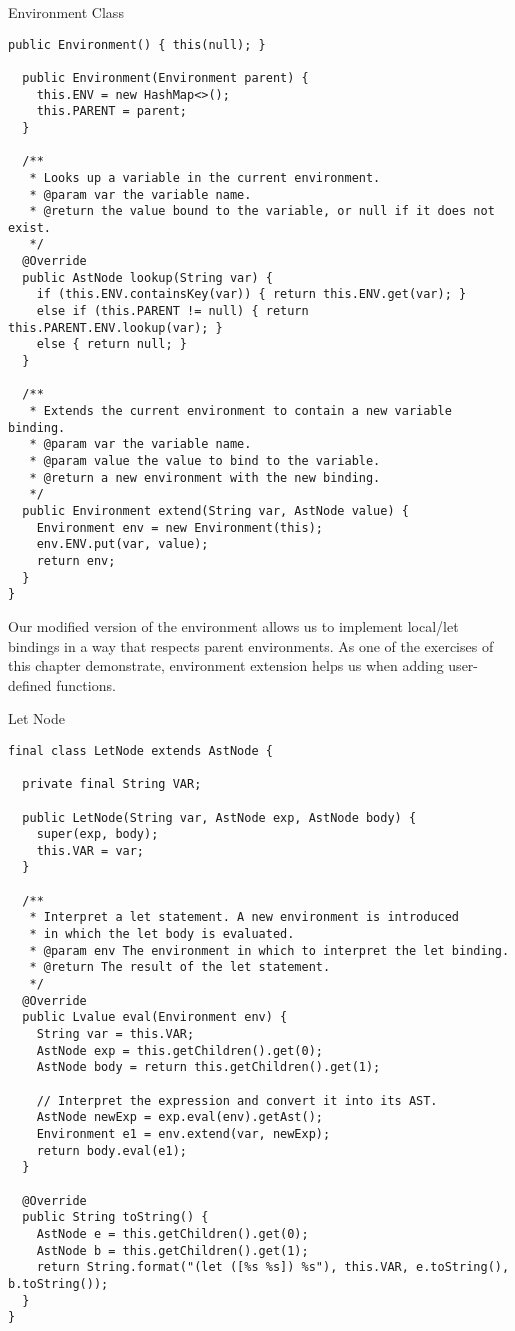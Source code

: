 \begin{verbnobox}[\footnotesize]
\begin{cl}[]{Environment Class}
\begin{lstlisting}[language=MyJava]
  public Environment() { this(null); }

  public Environment(Environment parent) { 
    this.ENV = new HashMap<>(); 
    this.PARENT = parent; 
  }

  /**
   * Looks up a variable in the current environment.
   * @param var the variable name.
   * @return the value bound to the variable, or null if it does not exist.
   */
  @Override
  public AstNode lookup(String var) {
    if (this.ENV.containsKey(var)) { return this.ENV.get(var); }
    else if (this.PARENT != null) { return this.PARENT.ENV.lookup(var); }
    else { return null; }
  }

  /**
   * Extends the current environment to contain a new variable binding.
   * @param var the variable name.
   * @param value the value to bind to the variable.
   * @return a new environment with the new binding.
   */
  public Environment extend(String var, AstNode value) {
    Environment env = new Environment(this);
    env.ENV.put(var, value);
    return env;
  }
}
\end{lstlisting}
\end{cl} 

Our modified version of the environment allows us to implement local/let bindings in a way that respects parent environments. As one of the exercises of this chapter demonstrate, environment extension helps us when adding user-defined functions.

\begin{cl}[]{Let Node}
\begin{lstlisting}[language=MyJava]
final class LetNode extends AstNode {

  private final String VAR;

  public LetNode(String var, AstNode exp, AstNode body) {
    super(exp, body);
    this.VAR = var;
  }

  /**
   * Interpret a let statement. A new environment is introduced 
   * in which the let body is evaluated.
   * @param env The environment in which to interpret the let binding.
   * @return The result of the let statement.
   */
  @Override
  public Lvalue eval(Environment env) {
    String var = this.VAR;
    AstNode exp = this.getChildren().get(0);
    AstNode body = return this.getChildren().get(1);

    // Interpret the expression and convert it into its AST.
    AstNode newExp = exp.eval(env).getAst();
    Environment e1 = env.extend(var, newExp);
    return body.eval(e1);
  }

  @Override
  public String toString() {
    AstNode e = this.getChildren().get(0);
    AstNode b = this.getChildren().get(1);
    return String.format("(let ([%s %s]) %s"), this.VAR, e.toString(), b.toString());
  }
}
\end{lstlisting}
\end{cl}


\end{verbnobox}
